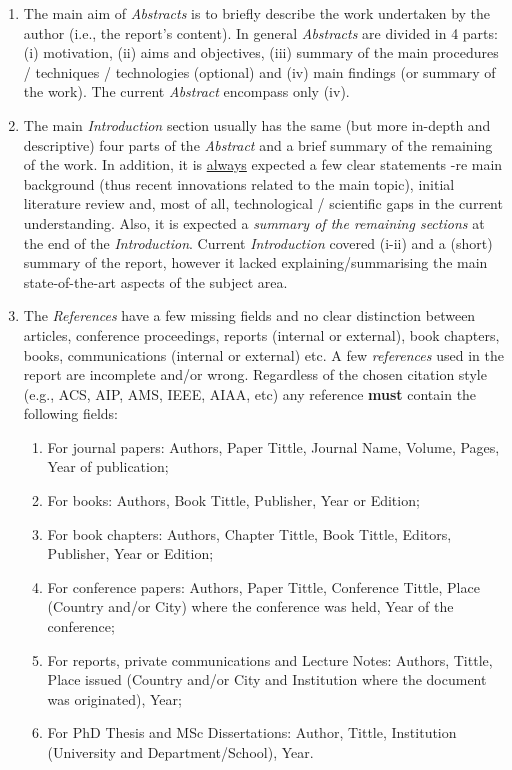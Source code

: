 \documentclass[14pt,twoside]{report}
\begin{document}
\begin{enumerate}
%
\item The main aim of {\it Abstracts} is to briefly describe the work undertaken by the author (i.e., the report's content). In general {\it Abstracts} are divided in 4 parts: (i) motivation, (ii) aims and objectives, (iii) summary of the main procedures / techniques / technologies (optional) and (iv) main findings (or summary of the work). The current {\it Abstract} encompass only (iv).
%
\item The main {\it Introduction} section usually has the same (but more in-depth and descriptive) four parts of the {\it Abstract} and a brief summary of the remaining of the work. In addition, it is \underline{always} expected a few clear statements -re main background (thus recent innovations related to the main topic), initial literature review and, most of all, technological / scientific gaps in the current understanding. Also, it is expected a {\it summary of the remaining sections} at the end of the {\it Introduction}.  Current {\it Introduction} covered (i-ii) and a (short) summary of the report, however it lacked explaining/summarising the main state-of-the-art aspects of the subject area.
%
\item The {\it References} have a few missing fields and no clear distinction between articles, conference proceedings, reports (internal or external), book chapters, books, communications (internal or external) etc.  A few {\it references} used in the report are incomplete and/or wrong. Regardless of the chosen citation style (e.g., ACS, AIP, AMS, IEEE, AIAA, etc) any reference {\bf must} contain the following fields: 
\begin{enumerate}
\item For journal papers: Authors, Paper Tittle, Journal Name, Volume, Pages, Year of publication;
\item For books: Authors, Book Tittle, Publisher, Year or Edition;
\item For book chapters: Authors, Chapter Tittle, Book Tittle, Editors, Publisher, Year or Edition;
\item For conference papers: Authors, Paper Tittle, Conference Tittle, Place (Country and/or City) where the conference was held, Year of the conference;
\item For reports, private communications and Lecture Notes: Authors, Tittle, Place issued (Country and/or City and Institution where the document was originated), Year;
\item For PhD Thesis and MSc Dissertations: Author, Tittle, Institution (University and Department/School), Year.

\end{enumerate}
\end{enumerate}
\end{document}
